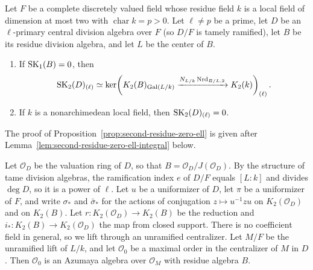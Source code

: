 \begin{proposition}\label{prop:second-residue-zero-ell}
Let $F$ be a complete discretely valued field whose residue field $k$ is a local field of dimension at most two with $\operatorname{char}k=p>0$.
Let $\ell\ne p$ be a prime, let $D$ be an $\ell$-primary central division algebra over $F$ (so $D/F$ is tamely ramified), let $B$ be its residue division algebra, and let $L$ be the center of $B$.
\begin{enumerate}
\item If $\operatorname{SK}_1(B)=0$, then
\[
 \operatorname{SK}_2(D)_{(\ell)}\simeq
 \ker\!\left(K_2(B)_{\operatorname{Gal}(L/k)}
   \xrightarrow{N_{L/k}\operatorname{Nrd}_{B/L,2}}K_2(k)\right)_{(\ell)}.
\]
\item If $k$ is a nonarchimedean local field, then $\operatorname{SK}_2(D)_{(\ell)}=0$.
\end{enumerate}
\end{proposition}
The proof of Proposition~\ref{prop:second-residue-zero-ell} is given after Lemma~\ref{lem:second-residue-zero-ell-integral} below.

Let $\mathcal O_D$ be the valuation ring of $D$, so that $B=\mathcal O_D/J(\mathcal O_D)$.
By the structure of tame division algebras, the ramification index $e$ of $D/F$ equals $[L:k]$ and divides $\deg D$, so it is a power of $\ell$.
Let $u$ be a uniformizer of $D$, let $\pi$ be a uniformizer of $F$, and write $\sigma_*$ and $\bar\sigma_*$ for the actions of conjugation $z\mapsto u^{-1}zu$ on $K_2(\mathcal O_D)$ and on $K_2(B)$.
Let $r\colon K_2(\mathcal O_D)\to K_2(B)$ be the reduction and $i_*\colon K_2(B)\to K_2(\mathcal O_D)$ the map from closed support.
There is no coefficient field in general, so we lift through an unramified centralizer.
Let $M/F$ be the unramified lift of $L/k$, and let $\mathcal O_0$ be a maximal order in the centralizer of $M$ in $D$.
Then $\mathcal O_0$ is an Azumaya algebra over $\mathcal O_M$ with residue algebra $B$.

